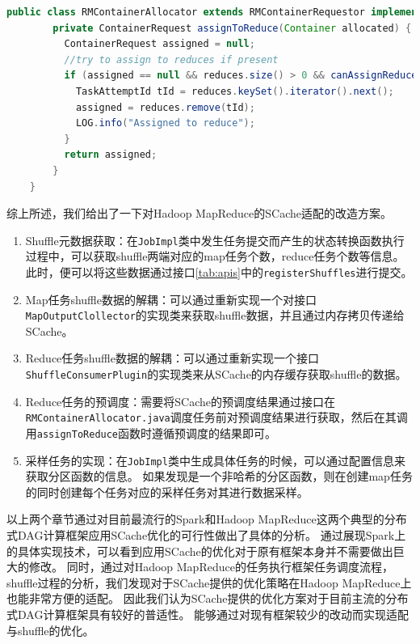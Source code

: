 \begin{lstlisting}[language={Java}, caption={Hadoop MapReduce中reduce任务调度代码片段}, label={code:hadoopschedule}]
    public class RMContainerAllocator extends RMContainerRequestor implements ContainerAllocator {
        private ContainerRequest assignToReduce(Container allocated) {
          ContainerRequest assigned = null;
          //try to assign to reduces if present
          if (assigned == null && reduces.size() > 0 && canAssignReduces()) {
            TaskAttemptId tId = reduces.keySet().iterator().next();
            assigned = reduces.remove(tId);
            LOG.info("Assigned to reduce");
          }
          return assigned;
        }
    }
\end{lstlisting}

综上所述，我们给出了一下对Hadoop MapReduce的SCache适配的改造方案。
\begin{enumerate}
    \item Shuffle元数据获取：在\verb|JobImpl|类中发生任务提交而产生的状态转换函数执行过程中，可以获取shuffle两端对应的map任务个数，reduce任务个数等信息。
    此时，便可以将这些数据通过接口\ref{tab:apis}中的\verb|registerShuffles|进行提交。
    \item Map任务shuffle数据的解耦：可以通过重新实现一个对接口\verb|MapOutputClollector|的实现类来获取shuffle数据，并且通过内存拷贝传递给SCache。
    \item Reduce任务shuffle数据的解耦：可以通过重新实现一个接口\verb|ShuffleConsumerPlugin|的实现类来从SCache的内存缓存获取shuffle的数据。
    \item Reduce任务的预调度：需要将SCache的预调度结果通过接口在\verb|RMContainerAllocator.java|调度任务前对预调度结果进行获取，然后在其调用\verb|assignToReduce|函数时遵循预调度的结果即可。
    \item 采样任务的实现：在\verb|JobImpl|类中生成具体任务的时候，可以通过配置信息来获取分区函数的信息。
    如果发现是一个非哈希的分区函数，则在创建map任务的同时创建每个任务对应的采样任务对其进行数据采样。
\end{enumerate}

以上两个章节通过对目前最流行的Spark和Hadoop MapReduce这两个典型的分布式DAG计算框架应用SCache优化的可行性做出了具体的分析。
通过展现Spark上的具体实现技术，可以看到应用SCache的优化对于原有框架本身并不需要做出巨大的修改。
同时，通过对Hadoop MapReduce的任务执行框架任务调度流程，shuffle过程的分析，我们发现对于SCache提供的优化策略在Hadoop MapReduce上也能非常方便的适配。
因此我们认为SCache提供的优化方案对于目前主流的分布式DAG计算框架具有较好的普适性。
能够通过对现有框架较少的改动而实现适配与shuffle的优化。